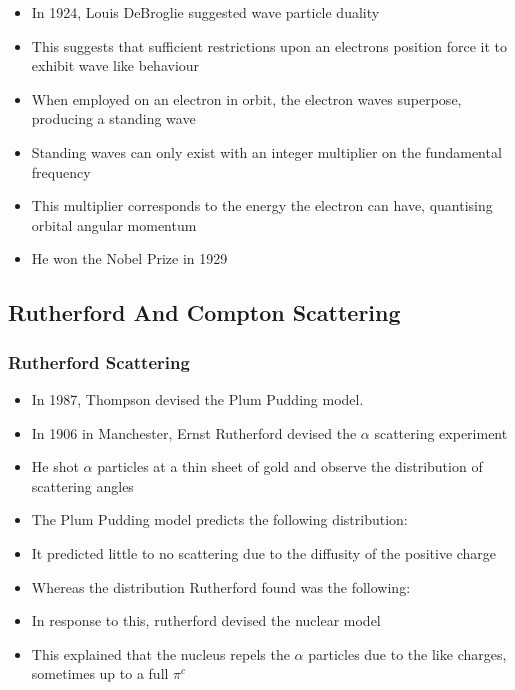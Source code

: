 \documentclass{article}
\begin{document}
\begin{itemize}
    \item In 1924, Louis DeBroglie suggested wave particle duality
    \item This suggests that sufficient restrictions upon an electrons position force it to exhibit wave like behaviour
    \item When employed on an electron in orbit, the electron waves superpose, producing a standing wave
    \item Standing waves can only exist with an integer multiplier on the fundamental frequency
    \item This multiplier corresponds to the energy the electron can have, quantising orbital angular momentum
    \item He won the Nobel Prize in 1929
\end{itemize}

\subsection{Rutherford And Compton Scattering}
\subsubsection*{Rutherford Scattering}

\begin{itemize}
    \item In 1987, Thompson devised the Plum Pudding model.
    \item In 1906 in Manchester, Ernst Rutherford devised the \(\alpha\) scattering experiment
    \item He shot \(\alpha\) particles at a thin sheet of gold and observe the distribution of scattering angles
    \item The Plum Pudding model predicts the following distribution:
    \item It predicted little to no scattering due to the diffusity of the positive charge
    \item Whereas the distribution Rutherford found was the following:
    \item In response to this, rutherford devised the nuclear model
    \item This explained that the nucleus repels the $\alpha$ particles due to the like charges, sometimes up to a full $\pi^c$
\end{itemize}
\end{document}
